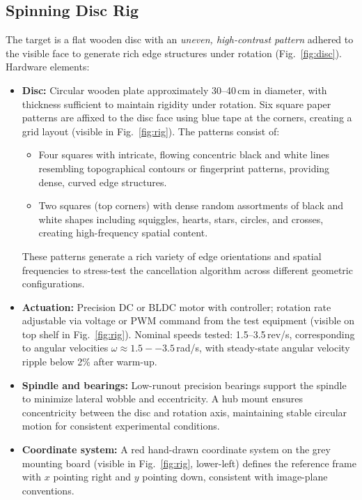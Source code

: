 \subsection{Spinning Disc Rig}
The target is a flat wooden disc with an \emph{uneven, high-contrast pattern} adhered to the visible face to generate rich edge structures under rotation (Fig.~\ref{fig:disc}). Hardware elements:

\begin{itemize}
  \item \textbf{Disc:} Circular wooden plate approximately 30--40\,cm in diameter, with thickness sufficient to maintain rigidity under rotation. Six square paper patterns are affixed to the disc face using blue tape at the corners, creating a grid layout (visible in Fig.~\ref{fig:rig}). The patterns consist of:
  \begin{itemize}
    \item Four squares with intricate, flowing concentric black and white lines resembling topographical contours or fingerprint patterns, providing dense, curved edge structures.
    \item Two squares (top corners) with dense random assortments of black and white shapes including squiggles, hearts, stars, circles, and crosses, creating high-frequency spatial content.
  \end{itemize}
  These patterns generate a rich variety of edge orientations and spatial frequencies to stress-test the cancellation algorithm across different geometric configurations.
  \item \textbf{Actuation:} Precision DC or BLDC motor with controller; rotation rate adjustable via voltage or PWM command from the test equipment (visible on top shelf in Fig.~\ref{fig:rig}). Nominal speeds tested: 1.5--3.5\,rev/s, corresponding to angular velocities $\omega \approx 1.5--3.5$\,rad/s, with steady-state angular velocity ripple below 2\% after warm-up.
  \item \textbf{Spindle and bearings:} Low-runout precision bearings support the spindle to minimize lateral wobble and eccentricity. A hub mount ensures concentricity between the disc and rotation axis, maintaining stable circular motion for consistent experimental conditions.
  \item \textbf{Coordinate system:} A red hand-drawn coordinate system on the grey mounting board (visible in Fig.~\ref{fig:rig}, lower-left) defines the reference frame with $x$ pointing right and $y$ pointing down, consistent with image-plane conventions.
\end{itemize}

